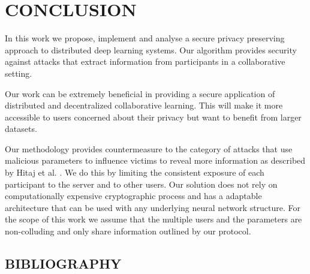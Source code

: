 \documentclass[letterpaper]{article}
\begin{document}
\begin{flushleft}
{\section{CONCLUSION}
In this work we propose, implement and analyse a secure privacy preserving approach to distributed deep learning systems.  Our algorithm provides security against attacks that extract information from participants in a collaborative setting. 

Our work can be extremely beneficial in providing a secure application of distributed and decentralized collaborative learning. This will make it more accessible to users concerned about their privacy but want to benefit from larger datasets.

Our methodology provides countermeasure to the category of attacks that use malicious parameters to influence victims to reveal more information as described  by Hitaj  et al. \cite{hitaj2017deep} . We do this by limiting the consistent exposure of each participant to the server and to other users.
Our solution does not rely on computationally expensive cryptographic process and has a adaptable architecture that can be used with any underlying neural network structure.
For the scope of this work we assume that the multiple users and the parameters are non-colluding and only share information outlined by our protocol. 

\newpage

\begin{center}
\vspace*{\fill}
\section*{\normalfont BIBLIOGRAPHY}
\vspace*{\fill}
\end{center}
\newpage
\let\oldaddcontentsline\addcontentsline%
\renewcommand{\addcontentsline}[3]{}%
\renewcommand\bibname{\normalfont BIBLIOGRAPHY}

\let\addcontentsline\oldaddcontentsline%

\newpage
\appendix
{}
\renewcommand\thesubsection{\Alph{subsection}}
\newpage

\begin{center}
\vspace*{\fill}

\end{center}}
\end{flushleft}
\end{document}
